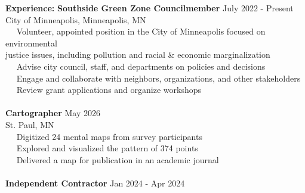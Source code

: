 \documentclass[letterpaper,12pt]{article}
\numberwithin{equation}{section}
\begin{document}
\noindent\textbf{Experience:} \hspace*{.16in} \textbf{Southside Green Zone Councilmember} \hspace*{1.68in} July 2022 - Present\\
\hspace*{1.2in} City of Minneapolis, Minneapolis, MN \vspace*{.1cm}\\
\hspace*{1.2in} \textbullet ~~ Volunteer, appointed position in the City of Minneapolis focused on environmental\\
\hspace*{1.6in} justice issues, including pollution and racial \& economic marginalization\\
\hspace*{1.2in} \textbullet ~~ Advise city council, staff, and departments on policies and decisions\\
\hspace*{1.2in} \textbullet ~~ Engage and collaborate with neighbors, organizations, and other stakeholders\\
\hspace*{1.2in} \textbullet ~~ Review grant applications and organize workshops\\
\\
\hspace*{1.16in} \textbf{Cartographer} \hspace*{4.5in} May 2026\\
\hspace*{1.2in} St. Paul, MN \vspace*{.1cm}\\
\hspace*{1.2in} \textbullet ~~ Digitized 24 mental maps from survey participants\\
\hspace*{1.2in} \textbullet ~~ Explored and visualized the pattern of 374 points\\
\hspace*{1.2in} \textbullet ~~ Delivered a map for publication in an academic journal\\
\\
\hspace*{1.16in}\textbf{Independent Contractor} \hspace*{2.8in} Jan 2024 - Apr 2024\\
\end{document}
